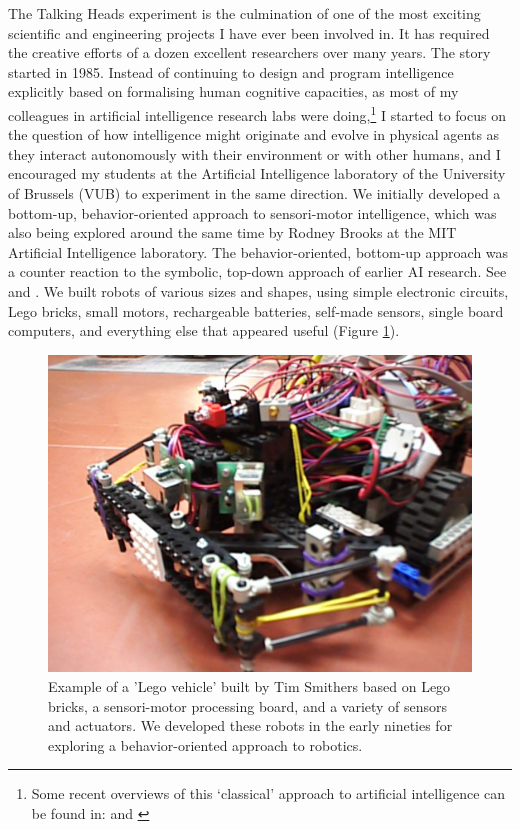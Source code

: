 The Talking Heads experiment is the culmination of one of
the most exciting scientific and engineering projects I have
ever been involved in. It has required the
creative efforts of a dozen excellent researchers 
over many years. The story started in 
1985. Instead of continuing to design and program intelligence
explicitly based on formalising human cognitive
capacities, as most of my colleagues
in artificial intelligence research 
labs were doing,\footnote{
Some recent overviews of this `classical' approach to 
artificial intelligence can be found in: \cite{Nilsson:1998} and 
\cite{Russell:1998}}
I started to focus on the 
question of how intelligence might
originate and evolve in physical agents as they 
interact autonomously with their environment or with 
other humans, and I encouraged my students
at the Artificial Intelligence laboratory of the University 
of Brussels (VUB) to experiment in the same direction. 
We initially developed a bottom-up, 
behavior-oriented approach to sensori-motor intelligence, 
which was also being explored around the same time by 
Rodney Brooks at the MIT Artificial Intelligence 
laboratory.
The behavior-oriented, bottom-up approach  was a 
counter reaction to the symbolic, top-down approach of 
earlier AI research. See \cite{Steels:1995} and \cite{Arkin:1998}. 
We built robots of various sizes and shapes, using simple
electronic circuits, Lego bricks, small motors, rechargeable
batteries, self-made 
sensors, single board computers, and everything else that 
appeared useful (Figure \ref{f:plate3}). 

\begin{figure}[htbp]
  \centerline{\includegraphics[width=.60\textwidth]{chap1/figs/robot}}
\caption{\small Example of a 'Lego vehicle' built by Tim Smithers based on Lego bricks, a sensori-motor processing board, 
and a variety of 
sensors and actuators. We developed these robots in the early nineties for exploring a behavior-oriented 
approach to robotics.}
\label{f:plate3}
\end{figure}

